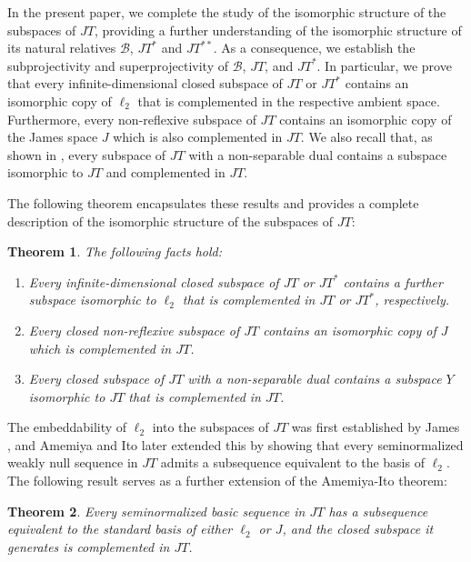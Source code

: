 \documentclass[12pt]{amsart}
\theoremstyle{plain}
\numberwithin{equation}{section}
\newtheorem{theorem}{Theorem}[section]
\begin{document}
In the present paper, we complete the study of the isomorphic structure of the subspaces of $JT$, providing a further understanding of the isomorphic structure of its natural relatives $\mathcal{B}$, $JT^*$ and $JT^{**}$. As a consequence, we establish the subprojectivity and superprojectivity of $\mathcal{B}$, $JT$, and $JT^*$. In particular, we prove that every infinite-dimensional closed subspace of $JT$ or $JT^*$ contains an isomorphic copy of $\ell_2$ that is complemented in the respective ambient space. Furthermore, every non-reflexive subspace of $JT$ contains an isomorphic copy of the James space $J$ which is also complemented in $JT$. We also recall that, as shown in \cite{AAK:08}, every subspace of $JT$ with a non-separable dual contains a subspace isomorphic to $JT$ and complemented in $JT$.

The following theorem encapsulates these results and provides a complete description of the isomorphic structure of the subspaces of $JT$:

\begin{theorem}
The following facts hold:
\begin{enumerate}
    \item Every infinite-dimensional closed subspace of $JT$ or $JT^*$ contains a further subspace isomorphic to $\ell_2$ that is complemented in $JT$ or $JT^*$, respectively.
    \item Every closed non-reflexive subspace of $JT$ contains an isomorphic copy of $J$ which is complemented in $JT$.
    \item Every closed subspace of $JT$ with a non-separable dual contains a subspace $Y$ isomorphic to $JT$ that is complemented in $JT$.
\end{enumerate}
\end{theorem}

The embeddability of $\ell_2$ into the subspaces of $JT$ was first established by James \cite{James:74}, and Amemiya and Ito later extended this by showing that every seminormalized weakly null sequence in $JT$ admits a subsequence equivalent to the basis of $\ell_2$. The following result serves as a further extension of the Amemiya-Ito theorem:

\begin{theorem}
Every seminormalized basic sequence in $JT$ has a subsequence equivalent to the standard basis of either $\ell_2$ or $J$, and the closed subspace it generates is complemented in $JT$.
\end{theorem}
\end{document}
